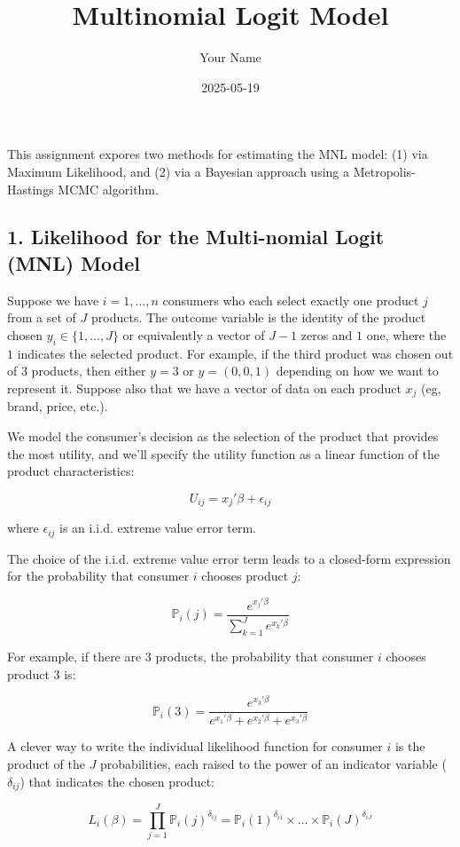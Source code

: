 \documentclass[
  letterpaper,
  DIV=11,
  numbers=noendperiod]{scrartcl}
\title{Multinomial Logit Model}
\author{Your Name}
\date{2025-05-19}
\begin{document}
\maketitle


This assignment expores two methods for estimating the MNL model: (1)
via Maximum Likelihood, and (2) via a Bayesian approach using a
Metropolis-Hastings MCMC algorithm.

\subsection{1. Likelihood for the Multi-nomial Logit (MNL)
Model}\label{likelihood-for-the-multi-nomial-logit-mnl-model}

Suppose we have \(i=1,\ldots,n\) consumers who each select exactly one
product \(j\) from a set of \(J\) products. The outcome variable is the
identity of the product chosen \(y_i \in \{1, \ldots, J\}\) or
equivalently a vector of \(J-1\) zeros and \(1\) one, where the \(1\)
indicates the selected product. For example, if the third product was
chosen out of 3 products, then either \(y=3\) or \(y=(0,0,1)\) depending
on how we want to represent it. Suppose also that we have a vector of
data on each product \(x_j\) (eg, brand, price, etc.).

We model the consumer's decision as the selection of the product that
provides the most utility, and we'll specify the utility function as a
linear function of the product characteristics:

\[ U_{ij} = x_j'\beta + \epsilon_{ij} \]

where \(\epsilon_{ij}\) is an i.i.d. extreme value error term.

The choice of the i.i.d. extreme value error term leads to a closed-form
expression for the probability that consumer \(i\) chooses product
\(j\):

\[ \mathbb{P}_i(j) = \frac{e^{x_j'\beta}}{\sum_{k=1}^Je^{x_k'\beta}} \]

For example, if there are 3 products, the probability that consumer
\(i\) chooses product 3 is:

\[ \mathbb{P}_i(3) = \frac{e^{x_3'\beta}}{e^{x_1'\beta} + e^{x_2'\beta} + e^{x_3'\beta}} \]

A clever way to write the individual likelihood function for consumer
\(i\) is the product of the \(J\) probabilities, each raised to the
power of an indicator variable (\(\delta_{ij}\)) that indicates the
chosen product:

\[ L_i(\beta) = \prod_{j=1}^J \mathbb{P}_i(j)^{\delta_{ij}} = \mathbb{P}_i(1)^{\delta_{i1}} \times \ldots \times \mathbb{P}_i(J)^{\delta_{iJ}}\]
\end{document}
